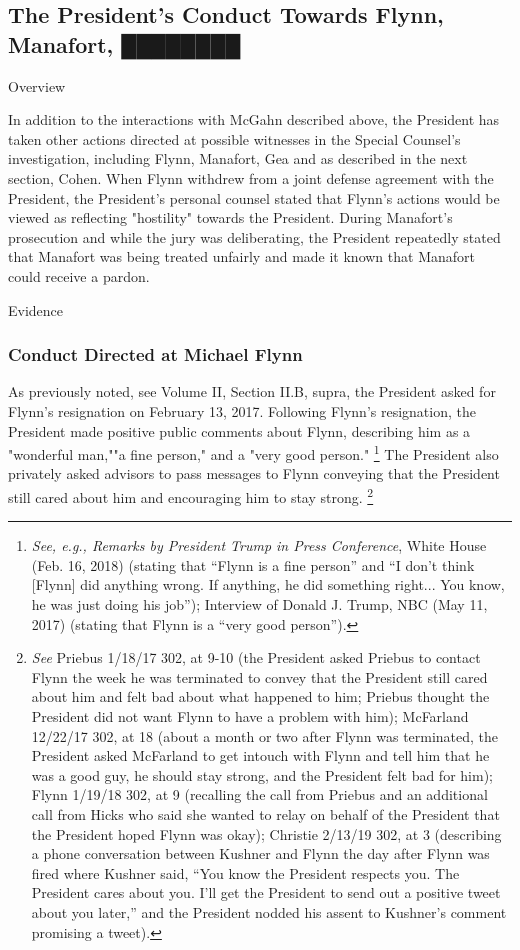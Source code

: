 {\subsection{The President's Conduct Towards Flynn, Manafort, ████████}

Overview

In addition to the interactions with McGahn described above, the President has taken other actions directed at possible witnesses in the Special Counsel's investigation, including Flynn, Manafort, Gea and as described in the next section, Cohen.
When Flynn withdrew from a joint defense agreement with the President, the President's personal counsel stated that Flynn's actions would be viewed as reflecting "hostility" towards the President.
During Manafort's prosecution and while the jury was deliberating, the President repeatedly stated that Manafort was being treated unfairly and made it known that Manafort could receive a pardon.

Evidence

\subsubsection{Conduct Directed at Michael Flynn}

As previously noted, see Volume II, Section II.B, supra, the President asked for Flynn's resignation on February 13, 2017.
Following Flynn's resignation, the President made positive public comments about Flynn, describing him as a "wonderful man,""a fine person," and a "very good person."%
\footnote{\textit{See, e.g., Remarks by President Trump in Press Conference}, White House (Feb. 16, 2018) (stating that “Flynn is a fine person” and “I don’t think [Flynn] did anything wrong.
If anything, he did something right... You know, he was just doing his job”);
Interview of Donald J. Trump, NBC (May 11, 2017) (stating that Flynn is a “very good person”).}
The President also privately asked advisors to pass messages to Flynn conveying that the President still cared about him and encouraging him to stay strong.%
\footnote{\textit{See} Priebus 1/18/17 302, at 9-10 (the President asked Priebus to contact Flynn the week he was terminated to convey that the President still cared about him and felt bad about what happened to him;
Priebus thought the President did not want Flynn to have a problem with him);
McFarland 12/22/17 302, at 18 (about a month or two after Flynn was terminated, the President asked McFarland to get intouch with Flynn and tell him that he was a good guy, he should stay strong, and the President felt bad for him);
Flynn 1/19/18 302, at 9 (recalling the call from Priebus and an additional call from Hicks who said she wanted to relay on behalf of the President that the President hoped Flynn was okay);
Christie 2/13/19 302, at 3 (describing a phone conversation between Kushner and Flynn the day after Flynn was fired where Kushner said, “You know the President respects you.
The President cares about you.
I’ll get the President to send out a positive tweet about you later,” and the President nodded his assent to Kushner’s comment promising a tweet).}

}
